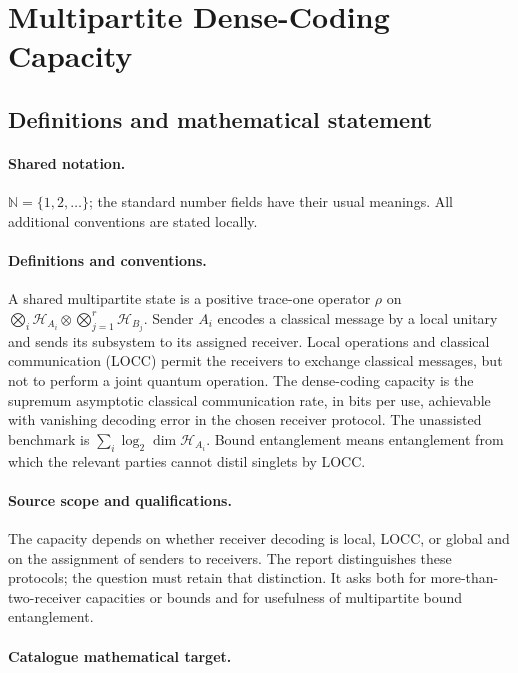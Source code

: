 \documentclass[11pt]{article}
\begin{document}
\section{Multipartite Dense-Coding Capacity}\label{statement}

\subsection{Definitions and mathematical statement}

\paragraph{Shared notation.}$\mathbb N=\{1,2,\ldots\}$; the standard number fields have their usual meanings. All additional conventions are stated locally.


\paragraph{Definitions and conventions.} A shared multipartite state is a positive trace-one operator $\rho$ on $\bigotimes_i\mathcal H_{A_i}\otimes\bigotimes_{j=1}^r\mathcal H_{B_j}$. Sender $A_i$ encodes a classical message by a local unitary and sends its subsystem to its assigned receiver. Local operations and classical communication (LOCC) permit the receivers to exchange classical messages, but not to perform a joint quantum operation. The dense-coding capacity is the supremum asymptotic classical communication rate, in bits per use, achievable with vanishing decoding error in the chosen receiver protocol. The unassisted benchmark is $\sum_i\log_2\dim\mathcal H_{A_i}$. Bound entanglement means entanglement from which the relevant parties cannot distil singlets by LOCC.

\paragraph{Source scope and qualifications.} The capacity depends on whether receiver decoding is local, LOCC, or global and on the assignment of senders to receivers. The report distinguishes these protocols; the question must retain that distinction. It asks both for more-than-two-receiver capacities or bounds and for usefulness of multipartite bound entanglement.

\paragraph{Catalogue mathematical target.}
\end{document}
